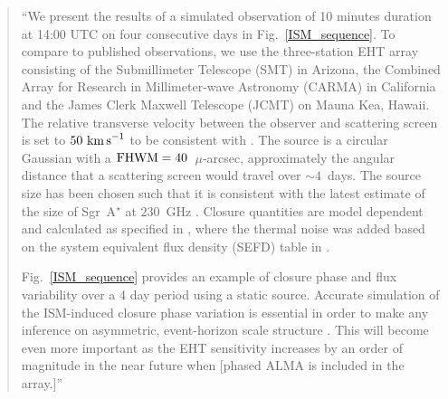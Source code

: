 \begin{quotation}  
``We present the results of a simulated observation of 10 minutes duration at 14:00 UTC on four consecutive days in Fig.~\ref{ISM_sequence}. To compare to published observations, we use the three-station EHT array consisting of the Submillimeter Telescope (SMT) in Arizona, the Combined Array for Research in Millimeter-wave Astronomy (CARMA) in California and the James Clerk Maxwell Telescope (JCMT) on Mauna Kea, Hawaii. The relative transverse velocity between the observer and scattering screen is set to $50~\rm{km\,s}^{-1}$ to be consistent with \citet{Ortiz_2016}. The source is a circular Gaussian with a $\rm{FHWM}=40$~$\mu$-arcsec, approximately the angular distance that a scattering screen would travel over $\sim 4$~days. The source size has been chosen such that it is consistent with the latest estimate of the size of Sgr~A$^\star$ at $230$~GHz \citep{Fish_2011}.  Closure quantities are model dependent and calculated as specified in \citet{Rogers_1995}, where the thermal noise was added based on the system equivalent flux density (SEFD) table in \citep{Lu_2014}.


Fig.~\ref{ISM_sequence} provides an example of closure phase and flux variability over a 4 day period using a static source. Accurate simulation of the ISM-induced closure phase variation is essential in order to make any inference on asymmetric, event-horizon scale structure \citep[e.g.][]{Fish_2016,Ortiz_2016}. This will become even more important as the EHT sensitivity increases by an order of magnitude in the near future when [phased ALMA is included in the array.]''
\citep{Blecher_2016} 
\end{quotation}


